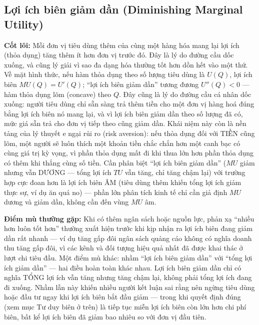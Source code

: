 \documentclass[
]{article}
\begin{document}
\subsection{Lợi ích biên giảm dần (Diminishing Marginal
Utility)}\label{lux1ee3i-uxedch-biuxean-giux1ea3m-dux1ea7n-diminishing-marginal-utility}

\textbf{Cốt lõi:} Mỗi đơn vị tiêu dùng thêm của cùng một hàng hóa mang
lại lợi ích (thỏa dụng) tăng thêm ít hơn đơn vị trước đó. Đây là lý do
đường cầu dốc xuống, và cũng lý giải vì sao đa dạng hóa thường tốt hơn
dồn hết vào một thứ. Về mặt hình thức, nếu hàm thỏa dụng theo số lượng
tiêu dùng là \(U(Q)\), lợi ích biên \(MU(Q) = U'(Q)\); ``lợi ích biên
giảm dần'' tương đương \(U''(Q) < 0\) --- hàm thỏa dụng lõm (concave)
theo \(Q\). Đây cũng là lý do đường cầu cá nhân dốc xuống: người tiêu
dùng chỉ sẵn sàng trả thêm tiền cho một đơn vị hàng hoá đúng bằng lợi
ích biên nó mang lại, và vì lợi ích biên giảm dần theo số lượng đã có,
mức giá sẵn trả cho đơn vị tiếp theo cũng giảm dần. Khái niệm này còn là
nền tảng của lý thuyết e ngại rủi ro (risk aversion): nếu thỏa dụng đối
với TIỀN cũng lõm, một người sẽ luôn thích một khoản tiền chắc chắn hơn
một canh bạc có cùng giá trị kỳ vọng, vì phần thỏa dụng mất đi khi thua
lớn hơn phần thỏa dụng có thêm khi thắng cùng số tiền. Cần phân biệt
``lợi ích biên giảm dần'' (\(MU\) giảm nhưng vẫn DƯƠNG --- tổng lợi ích
\(TU\) vẫn tăng, chỉ tăng chậm lại) với trường hợp cực đoan hơn là lợi
ích biên ÂM (tiêu dùng thêm khiến tổng lợi ích giảm thực sự, ví dụ ăn
quá no) --- phần lớn phân tích kinh tế chỉ cần giả định \(MU\) dương và
giảm dần, không cần đến vùng \(MU\) âm.

\textbf{Điểm mù thường gặp:} Khi có thêm ngân sách hoặc nguồn lực, phản
xạ ``nhiều hơn luôn tốt hơn'' thường xuất hiện trước khi kịp nhận ra lợi
ích biên đang giảm dần rất nhanh --- ví dụ tăng gấp đôi ngân sách quảng
cáo không có nghĩa doanh thu tăng gấp đôi, vì các kênh và đối tượng hiệu
quả nhất đã được khai thác ở lượt chi tiêu đầu. Một điểm mù khác: nhầm
``lợi ích biên giảm dần'' với ``tổng lợi ích giảm dần'' --- hai điều
hoàn toàn khác nhau. Lợi ích biên giảm dần chỉ có nghĩa TỔNG lợi ích vẫn
tăng nhưng tăng chậm lại, không phải tổng lợi ích đang đi xuống. Nhầm
lẫn này khiến nhiều người kết luận sai rằng nên ngừng tiêu dùng hoặc đầu
tư ngay khi lợi ích biên bắt đầu giảm --- trong khi quyết định đúng (xem
mục Tư duy biên ở trên) là tiếp tục miễn lợi ích biên còn lớn hơn chi
phí biên, bất kể lợi ích biên đã giảm bao nhiêu so với đơn vị đầu tiên.
\end{document}
